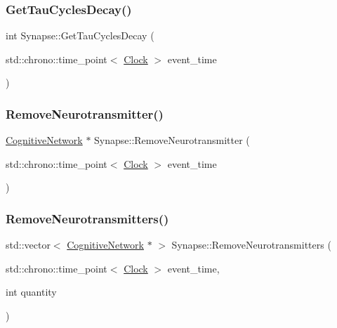 \mbox{\label{classSynapse_ab56dd60c4bb15a07faef144ec58bcee2}} 
\subsubsection{\texorpdfstring{Get\+Tau\+Cycles\+Decay()}{GetTauCyclesDecay()}}
{\footnotesize\ttfamily int Synapse\+::\+Get\+Tau\+Cycles\+Decay (\begin{DoxyParamCaption}\item[{std\+::chrono\+::time\+\_\+point$<$ \mbox{\hyperlink{universe_8h_a0ef8d951d1ca5ab3cfaf7ab4c7a6fd80}{Clock}} $>$}]{event\+\_\+time }\end{DoxyParamCaption})\hspace{0.3cm}{\ttfamily [inline]}}

\mbox{\label{classSynapse_a29593ed2f05d60fcbf1db3e931ef5c53}} 
\subsubsection{\texorpdfstring{Remove\+Neurotransmitter()}{RemoveNeurotransmitter()}}
{\footnotesize\ttfamily \mbox{\hyperlink{classCognitiveNetwork}{Cognitive\+Network}} $\ast$ Synapse\+::\+Remove\+Neurotransmitter (\begin{DoxyParamCaption}\item[{std\+::chrono\+::time\+\_\+point$<$ \mbox{\hyperlink{universe_8h_a0ef8d951d1ca5ab3cfaf7ab4c7a6fd80}{Clock}} $>$}]{event\+\_\+time }\end{DoxyParamCaption})}

\mbox{\label{classSynapse_adcf623e56f90e07344537d71c0a5d51b}} 
\subsubsection{\texorpdfstring{Remove\+Neurotransmitters()}{RemoveNeurotransmitters()}}
{\footnotesize\ttfamily std\+::vector$<$ \mbox{\hyperlink{classCognitiveNetwork}{Cognitive\+Network}} $\ast$ $>$ Synapse\+::\+Remove\+Neurotransmitters (\begin{DoxyParamCaption}\item[{std\+::chrono\+::time\+\_\+point$<$ \mbox{\hyperlink{universe_8h_a0ef8d951d1ca5ab3cfaf7ab4c7a6fd80}{Clock}} $>$}]{event\+\_\+time,  }\item[{int}]{quantity }\end{DoxyParamCaption})}

